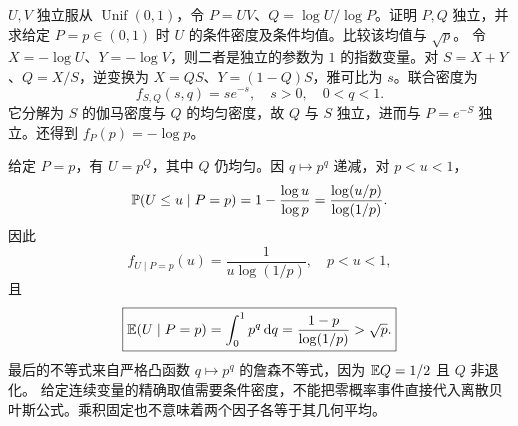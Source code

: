$U,V$ 独立服从 $\operatorname{Unif}(0,1)$，令 $P=UV$、$Q=\log U/\log P$。证明 $P,Q$ 独立，并求给定 $P=p\in(0,1)$ 时 $U$ 的条件密度及条件均值。比较该均值与 $\sqrt p$。
\solution 令 $X=-\log U$、$Y=-\log V$，则二者是独立的参数为 $1$ 的指数变量。对 $S=X+Y$、$Q=X/S$，逆变换为 $X=QS$、$Y=(1-Q)S$，雅可比为 $s$。联合密度为
\[
f_{S,Q}(s,q)=s e^{-s},\quad s>0,\quad0<q<1.
\]
它分解为 $S$ 的伽马密度与 $Q$ 的均匀密度，故 $Q$ 与 $S$ 独立，进而与 $P=e^{-S}$ 独立。还得到 $f_P(p)=-\log p$。

给定 $P=p$，有 $U=p^Q$，其中 $Q$ 仍均匀。因 $q\mapsto p^q$ 递减，对 $p<u<1$，
\[
\mathbb{P}(U\le u\mid P=p)=1-\frac{\log u}{\log p}
=\frac{\log(u/p)}{\log(1/p)}.
\]
因此
\[
\boxed{f_{U\mid P=p}(u)=\frac1{u\log(1/p)},\quad p<u<1,}
\]
且
\[
\boxed{\mathbb{E}(U\mid P=p)=\int_0^1p^q\,\mathrm{d} q
=\frac{1-p}{\log(1/p)}>\sqrt p.}
\]
最后的不等式来自严格凸函数 $q\mapsto p^q$ 的詹森不等式，因为 $\mathbb{E} Q=1/2$ 且 $Q$ 非退化。
\pitfall 给定连续变量的精确取值需要条件密度，不能把零概率事件直接代入离散贝叶斯公式。乘积固定也不意味着两个因子各等于其几何平均。
